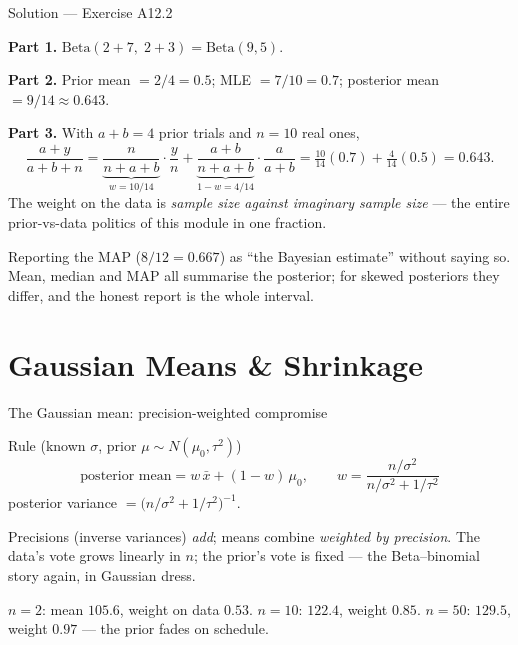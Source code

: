 \documentclass[aspectratio=169,11pt]{beamer}
\begin{document}
\begin{frame}{Solution --- Exercise A12.2}
  \begin{solutionbox}
    \footnotesize
    \textbf{Part 1.} $\text{Beta}(2 + 7,\; 2 + 3) = \text{Beta}(9, 5)$.
    \par\smallskip
    \textbf{Part 2.} Prior mean $= 2/4 = 0.5$; MLE $= 7/10 = 0.7$; posterior mean
    $= 9/14 \approx \mathbf{0.643}$.
    \par\smallskip
    \textbf{Part 3.} With $a + b = 4$ prior trials and $n = 10$ real ones,
    \[
      \frac{a + y}{a + b + n}
        = \underbrace{\frac{n}{n + a + b}}_{w = 10/14}\cdot\frac{y}{n}
        + \underbrace{\frac{a + b}{n + a + b}}_{1 - w = 4/14}\cdot\frac{a}{a+b}
        = \tfrac{10}{14}(0.7) + \tfrac{4}{14}(0.5) = 0.643.
    \]
    The weight on the data is \emph{sample size against imaginary sample size} ---
    the entire prior-vs-data politics of this module in one fraction.
  \end{solutionbox}
  \begin{mistake}
    Reporting the MAP ($8/12 = 0.667$) as ``the Bayesian estimate'' without saying
    so. Mean, median and MAP all summarise the posterior; for skewed posteriors
    they differ, and the honest report is the whole interval.
  \end{mistake}
\end{frame}

\section{Gaussian Means \& Shrinkage}

\begin{frame}{The Gaussian mean: precision-weighted compromise}
  \begin{block}{Rule (known $\sigma$, prior $\mu \sim N(\mu_0, \tau^2)$)}
    \[
      \boxed{\;\text{posterior mean}
        = w\,\bar x + (1 - w)\,\mu_0,
      \qquad
      w = \frac{n/\sigma^2}{n/\sigma^2 + 1/\tau^2}\;}
    \]
    posterior variance $= \big(n/\sigma^2 + 1/\tau^2\big)^{-1}$.
  \end{block}
  \begin{readme}
    \footnotesize
    Precisions (inverse variances) \emph{add}; means combine \emph{weighted by
    precision}. The data's vote grows linearly in $n$; the prior's vote is fixed
    --- the Beta--binomial story again, in Gaussian dress.
  \end{readme}
  \begin{numexample}[{{Prior $N(100, 15^2)$, $\sigma = 20$, truth $130$}}]
    \footnotesize
    $n = 2$: mean $105.6$, weight on data $0.53$. $n = 10$: $122.4$, weight
    $0.85$. $n = 50$: $129.5$, weight $0.97$ --- the prior fades on schedule.
  \end{numexample}
\end{frame}
\end{document}
